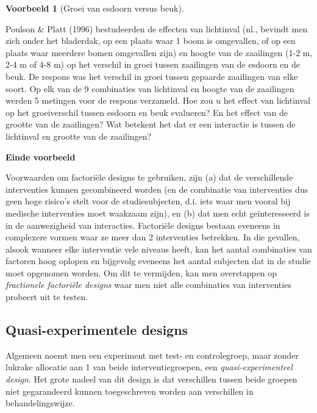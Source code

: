 \documentclass[
  12pt,dutch]{book}
\theoremstyle{definition}
\theoremstyle{definition}
\newtheorem{example}{Voorbeeld}[chapter]
\theoremstyle{definition}
\theoremstyle{definition}
\theoremstyle{remark}
\begin{document}
\begin{example}[Groei van esdoorn versus beuk]
\protect\hypertarget{exm:unnamed-chunk-80}{}\label{exm:unnamed-chunk-80}~
\end{example}

Poulson \& Platt (1996) bestudeerden de effecten van lichtinval (nl., bevindt men zich onder het bladerdak, op een plaats waar 1 boom is omgevallen, of op een plaats waar meerdere bomen omgevallen zijn) en hoogte van de zaailingen (1-2 m, 2-4 m of 4-8 m) op het verschil in groei tussen zaailingen van de esdoorn en de beuk. De respons was het verschil in groei tussen gepaarde zaailingen van elke soort. Op elk van de 9 combinaties van lichtinval en hoogte van de zaailingen werden 5 metingen voor de respons verzameld. Hoe zou
u het effect van lichtinval op het groeiverschil tussen esdoorn en beuk evalueren?
En het effect van de grootte van de zaailingen? Wat betekent het dat er een
interactie is tussen de lichtinval en grootte van de zaailingen?

\textbf{Einde voorbeeld}

Voorwaarden om factoriële designs te gebruiken, zijn (a) dat de
verschillende interventies kunnen gecombineerd worden (en de combinatie van
interventies dus geen hoge risico's stelt voor de studiesubjecten, d.i. iets waar men vooral bij medische interventies moet waakzaam zijn), en (b) dat men
echt geïnteresseerd is in de aanwezigheid van interacties. Factoriële designs bestaan eveneens in complexere vormen waar ze meer dan 2 interventies betrekken. In die gevallen, alsook wanneer elke interventie vele niveaus heeft, kan het aantal combinaties van factoren hoog oplopen en bijgevolg eveneens het aantal subjecten dat in de studie moet opgenomen worden. Om dit te vermijden, kan men overstappen op \emph{fractionele factoriële designs} waar men niet alle combinaties van interventies probeert uit te testen.

\subsection{Quasi-experimentele designs}\label{quasi-experimentele-designs}

Algemeen noemt men een experiment met test- en controlegroep, maar zonder
lukrake allocatie aan 1 van beide interventiegroepen, een \emph{quasi-experimenteel design}. Het grote nadeel van dit design is dat
verschillen tussen beide groepen niet gegarandeerd kunnen toegeschreven
worden aan verschillen in behandelingswijze.
\end{document}
